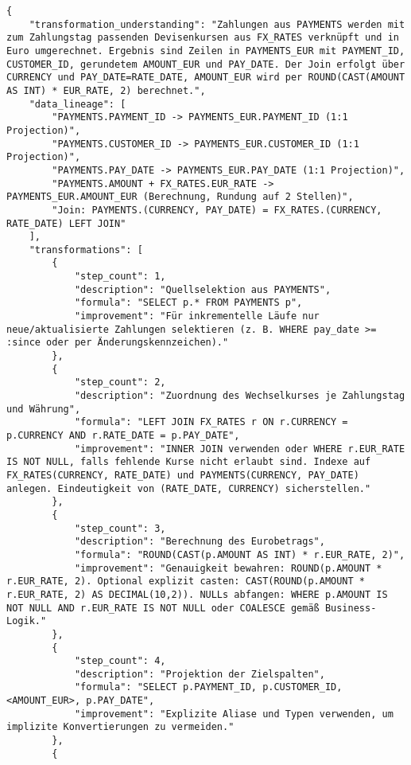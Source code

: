 \begin{lstlisting}[caption={Ausgabe: GPT-5 Anwendungsfall 4 Robustheitsdurchlauf},label={gpt_case4_prompt3}]
{
    "transformation_understanding": "Zahlungen aus PAYMENTS werden mit zum Zahlungstag passenden Devisenkursen aus FX_RATES verknüpft und in Euro umgerechnet. Ergebnis sind Zeilen in PAYMENTS_EUR mit PAYMENT_ID, CUSTOMER_ID, gerundetem AMOUNT_EUR und PAY_DATE. Der Join erfolgt über CURRENCY und PAY_DATE=RATE_DATE, AMOUNT_EUR wird per ROUND(CAST(AMOUNT AS INT) * EUR_RATE, 2) berechnet.",
    "data_lineage": [
        "PAYMENTS.PAYMENT_ID -> PAYMENTS_EUR.PAYMENT_ID (1:1 Projection)",
        "PAYMENTS.CUSTOMER_ID -> PAYMENTS_EUR.CUSTOMER_ID (1:1 Projection)",
        "PAYMENTS.PAY_DATE -> PAYMENTS_EUR.PAY_DATE (1:1 Projection)",
        "PAYMENTS.AMOUNT + FX_RATES.EUR_RATE -> PAYMENTS_EUR.AMOUNT_EUR (Berechnung, Rundung auf 2 Stellen)",
        "Join: PAYMENTS.(CURRENCY, PAY_DATE) = FX_RATES.(CURRENCY, RATE_DATE) LEFT JOIN"
    ],
    "transformations": [
        {
            "step_count": 1,
            "description": "Quellselektion aus PAYMENTS",
            "formula": "SELECT p.* FROM PAYMENTS p",
            "improvement": "Für inkrementelle Läufe nur neue/aktualisierte Zahlungen selektieren (z. B. WHERE pay_date >= :since oder per Änderungskennzeichen)."
        },
        {
            "step_count": 2,
            "description": "Zuordnung des Wechselkurses je Zahlungstag und Währung",
            "formula": "LEFT JOIN FX_RATES r ON r.CURRENCY = p.CURRENCY AND r.RATE_DATE = p.PAY_DATE",
            "improvement": "INNER JOIN verwenden oder WHERE r.EUR_RATE IS NOT NULL, falls fehlende Kurse nicht erlaubt sind. Indexe auf FX_RATES(CURRENCY, RATE_DATE) und PAYMENTS(CURRENCY, PAY_DATE) anlegen. Eindeutigkeit von (RATE_DATE, CURRENCY) sicherstellen."
        },
        {
            "step_count": 3,
            "description": "Berechnung des Eurobetrags",
            "formula": "ROUND(CAST(p.AMOUNT AS INT) * r.EUR_RATE, 2)",
            "improvement": "Genauigkeit bewahren: ROUND(p.AMOUNT * r.EUR_RATE, 2). Optional explizit casten: CAST(ROUND(p.AMOUNT * r.EUR_RATE, 2) AS DECIMAL(10,2)). NULLs abfangen: WHERE p.AMOUNT IS NOT NULL AND r.EUR_RATE IS NOT NULL oder COALESCE gemäß Business-Logik."
        },
        {
            "step_count": 4,
            "description": "Projektion der Zielspalten",
            "formula": "SELECT p.PAYMENT_ID, p.CUSTOMER_ID, <AMOUNT_EUR>, p.PAY_DATE",
            "improvement": "Explizite Aliase und Typen verwenden, um implizite Konvertierungen zu vermeiden."
        },
        {

\end{lstlisting}
